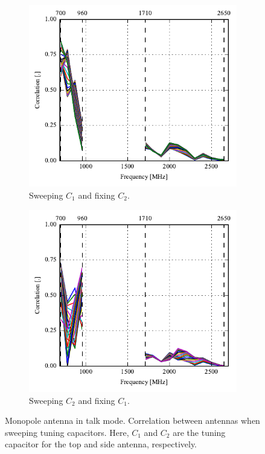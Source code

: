 \begin{figure}[htbp]
    \centering
    \begin{subfigure}{0.49\linewidth}
        \includegraphics{img/tech_sol/monopole/highband/ue/talkmode/corr_top.pdf}
        \caption{Sweeping $C_1$ and fixing $C_2$.}
    \end{subfigure}
    \hfill
    \begin{subfigure}{0.49\linewidth}
        \includegraphics{img/tech_sol/monopole/highband/ue/talkmode/corr_side.pdf}
        \caption{Sweeping $C_2$ and fixing $C_1$.}
    \end{subfigure}
    \caption{Monopole antenna in talk mode. Correlation between antennas when sweeping tuning capacitors. Here, $C_1$ and $C_2$ are the tuning capacitor for the top and side antenna, respectively.}
    \label{fig:corr_mono_modi_talk_mode}
\end{figure}


